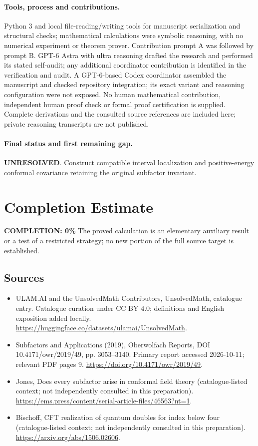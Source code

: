 \documentclass[11pt]{article}
\begin{document}
\paragraph{Tools, process and contributions.}
Python 3 and local file-reading/writing tools for manuscript serialization and structural checks; mathematical calculations were symbolic reasoning, with no numerical experiment or theorem prover. Contribution prompt A was followed by prompt B. GPT-6 Astra with ultra reasoning drafted the research and performed its stated self-audit; any additional coordinator contribution is identified in the verification and audit. A GPT-6-based Codex coordinator assembled the manuscript and checked repository integration; its exact variant and reasoning configuration were not exposed. No human mathematical contribution, independent human proof check or formal proof certification is supplied. Complete derivations and the consulted source references are included here; private reasoning transcripts are not published.

\paragraph{Final status and first remaining gap.}
\textbf{UNRESOLVED}. Construct compatible interval localization and positive-energy conformal covariance retaining the original subfactor invariant.

\section{Completion Estimate}
\noindent\textbf{COMPLETION: 0\%}
The proved calculation is an elementary auxiliary result or a test of a restricted strategy; no new portion of the full source target is established.

\subsection{Sources}
\begin{itemize}
\item[\hypertarget{source:statement:1}{S1}] ULAM.AI and the UnsolvedMath Contributors, UnsolvedMath, catalogue entry. Catalogue curation under CC BY 4.0; definitions and English exposition added locally.
\url{https://huggingface.co/datasets/ulamai/UnsolvedMath}.
\item[\hypertarget{source:statement:2}{S2}] Subfactors and Applications (2019), Oberwolfach Reports, DOI 10.4171/owr/2019/49, pp. 3053--3140. Primary report accessed 2026-10-11; relevant PDF pages 9.
\url{https://doi.org/10.4171/owr/2019/49}.
\item[\hypertarget{source:statement:3}{S3}] Jones, Does every subfactor arise in conformal field theory (catalogue-listed context; not independently consulted in this preparation).
\url{https://ems.press/content/serial-article-files/46563?nt=1}.
\item[\hypertarget{source:statement:4}{S4}] Bischoff, CFT realization of quantum doubles for index below four (catalogue-listed context; not independently consulted in this preparation).
\url{https://arxiv.org/abs/1506.02606}.
\end{itemize}
\label{end:statement}
\end{document}
